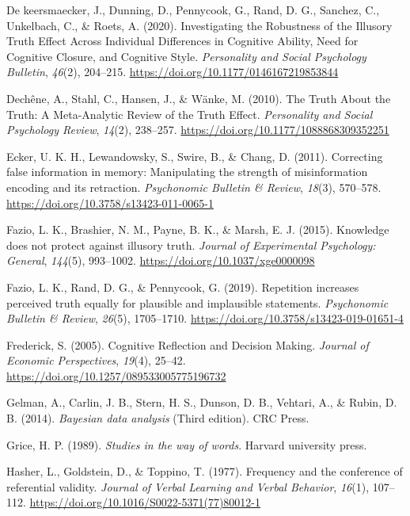 \documentclass[10pt, letterpaper]{article}
\newenvironment{CSLReferences}%
  {}%
  {\par}
\begin{document}
\begin{CSLReferences}
\leavevmode\hypertarget{ref-dekeersmaecker.etal2020}{}%
De keersmaecker, J., Dunning, D., Pennycook, G., Rand, D. G., Sanchez,
C., Unkelbach, C., \& Roets, A. (2020). Investigating the {Robustness}
of the {Illusory} {Truth} {Effect} {Across} {Individual} {Differences}
in {Cognitive} {Ability}, {Need} for {Cognitive} {Closure}, and
{Cognitive} {Style}. \emph{Personality and Social Psychology Bulletin},
\emph{46}(2), 204--215. \url{https://doi.org/10.1177/0146167219853844}

\leavevmode\hypertarget{ref-dechene.etal2010}{}%
Dechêne, A., Stahl, C., Hansen, J., \& Wänke, M. (2010). The {Truth}
{About} the {Truth}: {A} {Meta}-{Analytic} {Review} of the {Truth}
{Effect}. \emph{Personality and Social Psychology Review}, \emph{14}(2),
238--257. \url{https://doi.org/10.1177/1088868309352251}

\leavevmode\hypertarget{ref-ecker.etal2011}{}%
Ecker, U. K. H., Lewandowsky, S., Swire, B., \& Chang, D. (2011).
Correcting false information in memory: {Manipulating} the strength of
misinformation encoding and its retraction. \emph{Psychonomic Bulletin
\& Review}, \emph{18}(3), 570--578.
\url{https://doi.org/10.3758/s13423-011-0065-1}

\leavevmode\hypertarget{ref-fazio.etal2015}{}%
Fazio, L. K., Brashier, N. M., Payne, B. K., \& Marsh, E. J. (2015).
Knowledge does not protect against illusory truth. \emph{Journal of
Experimental Psychology: General}, \emph{144}(5), 993--1002.
\url{https://doi.org/10.1037/xge0000098}

\leavevmode\hypertarget{ref-fazio.etal2019}{}%
Fazio, L. K., Rand, D. G., \& Pennycook, G. (2019). Repetition increases
perceived truth equally for plausible and implausible statements.
\emph{Psychonomic Bulletin \& Review}, \emph{26}(5), 1705--1710.
\url{https://doi.org/10.3758/s13423-019-01651-4}

\leavevmode\hypertarget{ref-frederick2005}{}%
Frederick, S. (2005). Cognitive {Reflection} and {Decision} {Making}.
\emph{Journal of Economic Perspectives}, \emph{19}(4), 25--42.
\url{https://doi.org/10.1257/089533005775196732}

\leavevmode\hypertarget{ref-gelman.etal2014}{}%
Gelman, A., Carlin, J. B., Stern, H. S., Dunson, D. B., Vehtari, A., \&
Rubin, D. B. (2014). \emph{Bayesian data analysis} (Third edition). CRC
Press.

\leavevmode\hypertarget{ref-grice1989}{}%
Grice, H. P. (1989). \emph{Studies in the way of words}. Harvard
university press.

\leavevmode\hypertarget{ref-hasher.etal1977}{}%
Hasher, L., Goldstein, D., \& Toppino, T. (1977). Frequency and the
conference of referential validity. \emph{Journal of Verbal Learning and
Verbal Behavior}, \emph{16}(1), 107--112.
\url{https://doi.org/10.1016/S0022-5371(77)80012-1}


\end{CSLReferences}
\end{document}
